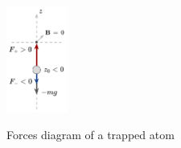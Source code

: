 \begin{figure}
    \centering
    \vspace{-25px}
    \caption{Forces diagram of a trapped atom}
    \includegraphics[width=0.18\textwidth]{USPSC-img/centre_of_mass_power_broadened_regime.png}
    \label{fig:forces-diagram-trapped-atom-nMOT-power-broadened-regime}
    \vspace{-20px}
\end{figure}

